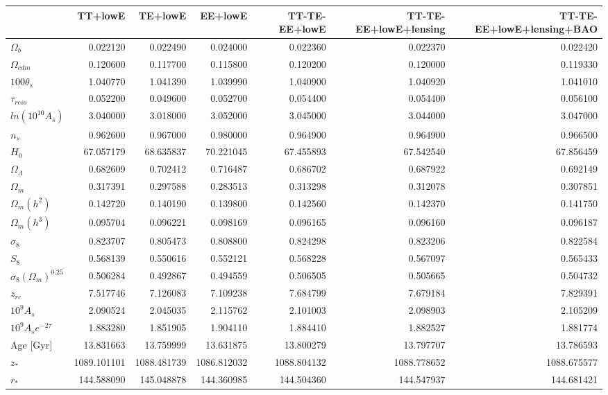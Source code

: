 \begin{tabular}{lrrrrrr}
\toprule
 & TT+lowE & TE+lowE & EE+lowE & TT-TE-EE+lowE & TT-TE-EE+lowE+lensing & TT-TE-EE+lowE+lensing+BAO \\
\midrule
$\Omega_b$ & 0.022120 & 0.022490 & 0.024000 & 0.022360 & 0.022370 & 0.022420 \\
$\Omega_{cdm}$ & 0.120600 & 0.117700 & 0.115800 & 0.120200 & 0.120000 & 0.119330 \\
$100\theta_{s}$ & 1.040770 & 1.041390 & 1.039990 & 1.040900 & 1.040920 & 1.041010 \\
$\tau_{reio}$ & 0.052200 & 0.049600 & 0.052700 & 0.054400 & 0.054400 & 0.056100 \\
$ln(10^{10}A_s)$ & 3.040000 & 3.018000 & 3.052000 & 3.045000 & 3.044000 & 3.047000 \\
$n_s$ & 0.962600 & 0.967000 & 0.980000 & 0.964900 & 0.964900 & 0.966500 \\
$H_0$ & 67.057179 & 68.635837 & 70.221045 & 67.455893 & 67.542540 & 67.856459 \\
$\Omega_{\Lambda}$ & 0.682609 & 0.702412 & 0.716487 & 0.686702 & 0.687922 & 0.692149 \\
$\Omega_m$ & 0.317391 & 0.297588 & 0.283513 & 0.313298 & 0.312078 & 0.307851 \\
$\Omega_m (h^2)$ & 0.142720 & 0.140190 & 0.139800 & 0.142560 & 0.142370 & 0.141750 \\
$\Omega_m (h^3)$ & 0.095704 & 0.096221 & 0.098169 & 0.096165 & 0.096160 & 0.096187 \\
$\sigma_8$ & 0.823707 & 0.805473 & 0.808800 & 0.824298 & 0.823206 & 0.822584 \\
$S_8$ & 0.568139 & 0.550616 & 0.552121 & 0.568228 & 0.567097 & 0.565433 \\
$\sigma_8 (\Omega_m)^{0.25}$ & 0.506284 & 0.492867 & 0.494559 & 0.506505 & 0.505665 & 0.504732 \\
$z_{re}$ & 7.517746 & 7.126083 & 7.109238 & 7.684799 & 7.679184 & 7.829391 \\
$10^9 A_s$ & 2.090524 & 2.045035 & 2.115762 & 2.101003 & 2.098903 & 2.105209 \\
$10^9 A_s e^{-2\tau}$ & 1.883280 & 1.851905 & 1.904110 & 1.884410 & 1.882527 & 1.881774 \\
Age [Gyr] & 13.831663 & 13.759999 & 13.631875 & 13.800279 & 13.797707 & 13.786593 \\
$z_{\ast}$ & 1089.101101 & 1088.481739 & 1086.812032 & 1088.804132 & 1088.778652 & 1088.675577 \\
$r_{\ast}$ & 144.588090 & 145.048878 & 144.360985 & 144.504360 & 144.547937 & 144.681421 \\

\end{tabular}
